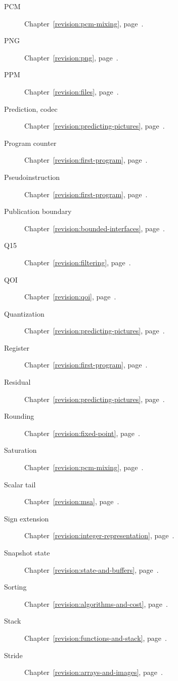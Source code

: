 \begin{description}
  \item[PCM] Chapter~\ref{revision:pcm-mixing}, page~\pageref{revision:pcm-mixing}.
  \item[PNG] Chapter~\ref{revision:png}, page~\pageref{revision:png}.
  \item[PPM] Chapter~\ref{revision:files}, page~\pageref{revision:files}.
  \item[Prediction, codec] Chapter~\ref{revision:predicting-pictures}, page~\pageref{revision:predicting-pictures}.
  \item[Program counter] Chapter~\ref{revision:first-program}, page~\pageref{revision:first-program}.
  \item[Pseudoinstruction] Chapter~\ref{revision:first-program}, page~\pageref{revision:first-program}.
  \item[Publication boundary] Chapter~\ref{revision:bounded-interfaces}, page~\pageref{revision:bounded-interfaces}.
  \item[Q15] Chapter~\ref{revision:filtering}, page~\pageref{revision:filtering}.
  \item[QOI] Chapter~\ref{revision:qoi}, page~\pageref{revision:qoi}.
  \item[Quantization] Chapter~\ref{revision:predicting-pictures}, page~\pageref{revision:predicting-pictures}.
  \item[Register] Chapter~\ref{revision:first-program}, page~\pageref{revision:first-program}.
  \item[Residual] Chapter~\ref{revision:predicting-pictures}, page~\pageref{revision:predicting-pictures}.
  \item[Rounding] Chapter~\ref{revision:fixed-point}, page~\pageref{revision:fixed-point}.
  \item[Saturation] Chapter~\ref{revision:pcm-mixing}, page~\pageref{revision:pcm-mixing}.
  \item[Scalar tail] Chapter~\ref{revision:msa}, page~\pageref{revision:msa}.
  \item[Sign extension] Chapter~\ref{revision:integer-representation}, page~\pageref{revision:integer-representation}.
  \item[Snapshot state] Chapter~\ref{revision:state-and-buffers}, page~\pageref{revision:state-and-buffers}.
  \item[Sorting] Chapter~\ref{revision:algorithms-and-cost}, page~\pageref{revision:algorithms-and-cost}.
  \item[Stack] Chapter~\ref{revision:functions-and-stack}, page~\pageref{revision:functions-and-stack}.
  \item[Stride] Chapter~\ref{revision:arrays-and-images}, page~\pageref{revision:arrays-and-images}.

\end{description}

